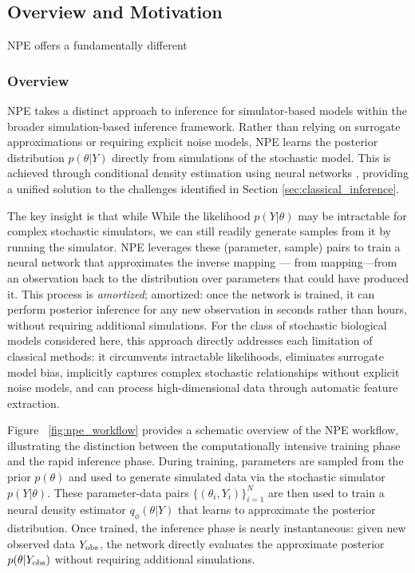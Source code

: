 \documentclass{article}
\providecommand{\DIFaddtex}[1]{{\protect\color{blue} \sf #1}} %
\providecommand{\DIFdeltex}[1]{{\protect\color{red} \scriptsize #1}} %
\providecommand{\DIFaddbegin}{} %
\providecommand{\DIFaddend}{} %
\providecommand{\DIFdelbegin}{} %
\providecommand{\DIFdelend}{} %
\providecommand{\DIFadd}[1]{\texorpdfstring{\DIFaddtex{#1}}{#1}} %
\providecommand{\DIFdel}[1]{\texorpdfstring{\DIFdeltex{#1}}{}} %
\newcommand{\DIFscaledelfig}{0.5}
\newlength{\DIFdelgraphicswidth} %
\newlength{\DIFdelgraphicsheight} %
\newcommand{\DIFaddincludegraphics}[2][]{{\color{blue}\fbox{\DIFOincludegraphics[#1]{#2}}}} %
\newcommand{\DIFdelincludegraphics}[2][]{%
\sbox{\DIFdelgraphicsbox}{\DIFOincludegraphics[#1]{#2}}%
\settoboxwidth{\DIFdelgraphicswidth}{\DIFdelgraphicsbox} %
\settoboxtotalheight{\DIFdelgraphicsheight}{\DIFdelgraphicsbox} %
\scalebox{\DIFscaledelfig}{%
\parbox[b]{\DIFdelgraphicswidth}{\usebox{\DIFdelgraphicsbox}\\[-\baselineskip] \rule{\DIFdelgraphicswidth}{0em}}\llap{\resizebox{\DIFdelgraphicswidth}{\DIFdelgraphicsheight}{%
\setlength{\unitlength}{\DIFdelgraphicswidth}%
\begin{picture}(1,1)%
\thicklines\linethickness{2pt} %
{\color[rgb]{1,0,0}\put(0,0){\framebox(1,1){}}}%
{\color[rgb]{1,0,0}\put(0,0){\line( 1,1){1}}}%
{\color[rgb]{1,0,0}\put(0,1){\line(1,-1){1}}}%
\end{picture}%
}\hspace*{3pt}}} %
} %
\DeclareRobustCommand{\DIFaddbegin}{\DIFOaddbegin \let\includegraphics\DIFaddincludegraphics} %
\DeclareRobustCommand{\DIFaddend}{\DIFOaddend \let\includegraphics\DIFOincludegraphics} %
\DeclareRobustCommand{\DIFdelbegin}{\DIFOdelbegin \let\includegraphics\DIFdelincludegraphics} %
\DeclareRobustCommand{\DIFdelend}{\DIFOaddend \let\includegraphics\DIFOincludegraphics} %
\begin{document}
\DIFdelbegin \subsection{\DIFdel{Overview and Motivation}}
\addtocounter{subsection}{-1}%
\DIFdel{NPE \citep{papamakarios2016fast, greenberg2019automatic,Cranmer2020FrontierSBI} offers a fundamentally different }\DIFdelend \DIFaddbegin \subsubsection{\DIFadd{Overview}}
\DIFadd{NPE \citep{papamakarios2016fast, greenberg2019automatic,Cranmer2020FrontierSBI} takes a distinct }\DIFaddend approach to inference for simulator-based models \DIFaddbegin \DIFadd{within the broader simulation-based inference framework}\DIFaddend . Rather than relying on surrogate approximations or requiring explicit noise models, NPE learns the posterior distribution $p(\theta | Y)$ directly from simulations of the stochastic model. This is achieved through conditional density estimation using neural networks\DIFdelbegin \DIFdel{, providing a unified solution to the challenges identified in Section \ref{sec:classical_inference}}\DIFdelend .

\DIFdelbegin \DIFdel{The key insight is that while }\DIFdelend \DIFaddbegin \DIFadd{While }\DIFaddend the likelihood $p(Y|\theta)$ may be intractable for complex stochastic simulators, we can still readily generate samples from it by running the simulator. NPE leverages these (parameter, sample) pairs to train a neural network that approximates the inverse \DIFdelbegin \DIFdel{mapping — from }\DIFdelend \DIFaddbegin \DIFadd{mapping---from }\DIFaddend an observation back to the distribution over parameters that could have produced it. This process is \DIFdelbegin \DIFdel{\textit{amortized}; }\DIFdelend \DIFaddbegin \DIFadd{amortized: }\DIFaddend once the network is trained, it can perform posterior inference for any new observation in seconds rather than hours, without requiring additional simulations. For the class of stochastic biological models considered here, this approach directly addresses each limitation of classical methods: it circumvents intractable likelihoods, eliminates surrogate model bias, implicitly captures complex stochastic relationships without explicit noise models, and can process high-dimensional data through automatic feature extraction.

Figure\DIFaddbegin \DIFadd{~}\DIFaddend \ref{fig:npe_workflow} provides a schematic overview of the NPE workflow, illustrating the distinction between the computationally intensive training phase and the rapid inference phase. During training, parameters are sampled from the prior $p(\theta)$ and used to generate simulated data via the stochastic simulator $p(Y|\theta)$. These parameter-data pairs $\{(\theta_i, Y_i)\}_{i=1}^N$ are then used to train a neural density estimator $q_\phi(\theta|Y)$ that learns to approximate the posterior distribution. Once trained, the inference phase is nearly instantaneous: given new observed data $Y_{\rm obs}$, the network directly evaluates the approximate posterior $p(\theta|Y_{\rm obs})$ without requiring additional simulations.
\end{document}
